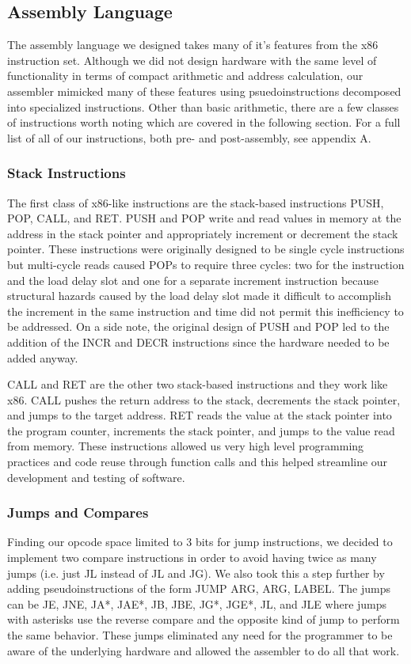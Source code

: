 \documentclass[onecolumn]{IEEEtran}
\begin{document}
\subsection{Assembly Language}
The assembly language we designed takes many of it’s features from the x86 instruction set.  Although we did not design hardware with the same level of functionality in terms of compact arithmetic and address calculation, our assembler mimicked many of these features using psuedoinstructions decomposed into specialized instructions.  Other than basic arithmetic, there are a few classes of instructions worth noting which are covered in the following section.  For a full list of all of our instructions, both pre- and post-assembly, see appendix A.

\subsubsection{Stack Instructions}
The first class of x86-like instructions are the stack-based instructions PUSH, POP, CALL, and RET.  PUSH and POP write and read values in memory at the address in the stack pointer and appropriately increment or decrement the stack pointer.  These instructions were originally designed to be single cycle instructions but multi-cycle reads caused POPs to require three cycles: two for the instruction and the load delay slot and one for a separate increment instruction because structural hazards caused by the load delay slot made it difficult to accomplish the increment in the same instruction and time did not permit this inefficiency to be addressed.  On a side note, the original design of PUSH and POP led to the addition of the INCR and DECR instructions since the hardware needed to be added anyway.

CALL and RET are the other two stack-based instructions and they work like x86.  CALL pushes the return address to the stack, decrements the stack pointer, and jumps to the target address.  RET reads the value at the stack pointer into the program counter, increments the stack pointer, and jumps to the value read from memory.  These instructions allowed us very high level programming practices and code reuse through function calls and this helped streamline our development and testing of software. 

\subsubsection{Jumps and Compares}
Finding our opcode space limited to 3 bits for jump instructions, we decided to implement two compare instructions in order to avoid having twice as many jumps (i.e. just JL instead of JL and JG).  We also took this a step further by adding pseudoinstructions of the form JUMP ARG, ARG, LABEL.  The jumps can be JE, JNE, JA*, JAE*, JB, JBE, JG*, JGE*, JL, and JLE where jumps with asterisks use the reverse compare and the opposite kind of jump to perform the same behavior.  These jumps eliminated any need for the programmer to be aware of the underlying hardware and allowed the assembler to do all that work.
\end{document}
